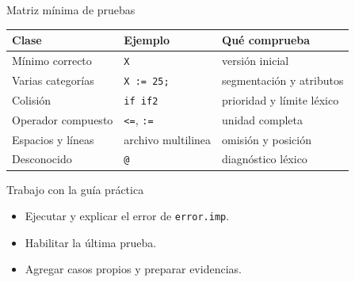 \documentclass[11pt,spanish]{beamer}
\newcommand{\actividad}[1]{\textbf{\textcolor{Rojo}{#1}}}
\begin{document}
\begin{frame}{Matriz mínima de pruebas}
\vfill

\begin{center}
\scriptsize
\renewcommand{\arraystretch}{1.25}
\begin{tabular}{|L{.28\textwidth}|L{.24\textwidth}|L{.30\textwidth}|}
\hline
\textbf{Clase} & \textbf{Ejemplo} & \textbf{Qué comprueba} \\
\hline
Mínimo correcto & \texttt{X} & versión inicial \\
\hline
Varias categorías & \texttt{X := 25;} & segmentación y atributos \\
\hline
Colisión & \texttt{if if2} & prioridad y límite léxico \\
\hline
Operador compuesto & \texttt{<=}, \texttt{:=} & unidad completa \\
\hline
Espacios y líneas & archivo multilinea & omisión y posición \\
\hline
Desconocido & \texttt{@} & diagnóstico léxico \\
\hline
\end{tabular}
\end{center}

\vfill
\end{frame}

\begin{frame}{Trabajo con la guía práctica}
\vfill
\begin{center}
\end{center}
\bigskip
\begin{itemize}
  \item Ejecutar y explicar el error de \texttt{error.imp}.
  \item Habilitar la última prueba.
  \item Agregar casos propios y preparar evidencias.
\end{itemize}
\vfill
\end{frame}
\end{document}

